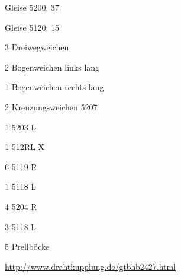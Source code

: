 \documentclass{article}
\begin{document}
Gleise 5200: 37

Gleise 5120: 15

3 Dreiwegweichen

2 Bogenweichen links lang

1 Bogenweichen rechts lang

2 Kreuzungsweichen 5207

1 5203 L

1 512RL X

6 5119 R

1 5118 L

4 5204 R

3 5118 L

5 Prellböcke

\url{http://www.drahtkupplung.de/gtbhb2427.html}

\newpage
% 
% 
% 
\newpage
{}
\end{document}
